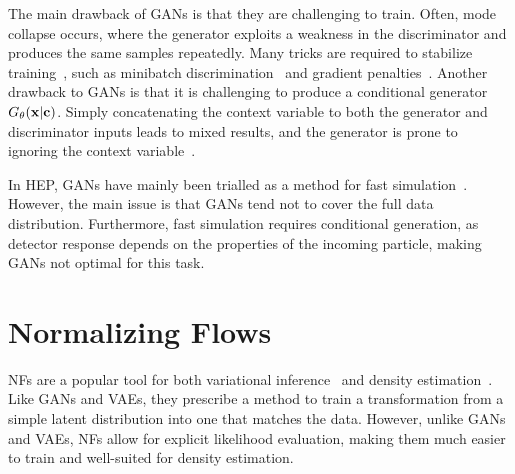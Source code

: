The main drawback of \Glspl{GAN} is that they are challenging to train.
Often, mode collapse occurs, where the generator exploits a weakness in the discriminator and produces the same samples repeatedly.
Many tricks are required to stabilize training~\cite{WhichTrainingMethods}, such as minibatch discrimination~\cite{ProGAN} and gradient penalties~\cite{WGAN}.
Another drawback to \Glspl{GAN} is that it is challenging to produce a conditional generator $G_\theta(\mathbf{x}|\mathbf{c})$.
Simply concatenating the context variable to both the generator and discriminator inputs leads to mixed results, and the generator is prone to ignoring the context variable~\cite{cGAN}.

In HEP, \Glspl{GAN} have mainly been trialled as a method for fast simulation~\cite{MPGAN, GAPT, CaloGAN, EPICGAN}.
However, the main issue is that \Glspl{GAN} tend not to cover the full data distribution.
Furthermore, fast simulation requires conditional generation, as detector response depends on the properties of the incoming particle, making \Glspl{GAN} not optimal for this task.

\section{Normalizing Flows}
\label{sec:flows}

NFs are a popular tool for both variational inference~\cite{VariationalInferenceNormalizing, NormalizingFlowsProbabilistic}
and density estimation~\cite{NICENonlinearIndependent}.
Like \Glspl{GAN} and \Glspl{VAE}, they prescribe a method to train a transformation from a simple latent distribution into one that matches the data.
However, unlike \Glspl{GAN} and \Glspl{VAE}, NFs allow for explicit likelihood evaluation, making them much easier to train and well-suited for density estimation.

